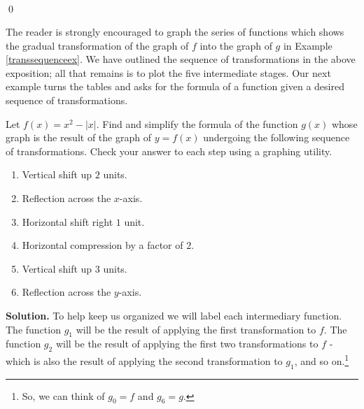 \begin{ex}
\[\begin{array}{cc}
\end{array}\]

\qed

\end{ex}


The reader is strongly encouraged to graph the series of functions which shows the gradual transformation of the graph of $f$ into the graph of $g$ in Example \ref{transsequenceex}.  We have outlined the sequence of transformations in the above exposition; all that remains is to plot the five intermediate stages.
Our next example turns the tables and asks for the formula of a function given a desired sequence of transformations.  

\begin{ex}  \label{graphingcalctrans} Let $f(x) = x^2 - |x|$.  Find and simplify the formula of the function $g(x)$ whose graph is the result of the graph of $y=f(x)$ undergoing the following sequence of transformations. Check your answer to each step using a graphing utility.
\begin{multicols}{2}
\begin{enumerate}

\item  Vertical shift up $2$ units.

\item  Reflection across the $x$-axis.

\item  Horizontal shift right $1$ unit.

\item  Horizontal compression by a factor of $2$.

\item  Vertical shift up $3$ units.

\item  Reflection across the $y$-axis.

\end{enumerate}
\end{multicols}

{\bf Solution.}  To help keep us organized we will label each intermediary function.  The function $g_{1}$ will be the result of applying the first transformation to $f$.  The function $g_{2}$ will be the result of applying the first two transformations to $f$ - which is also the result of applying the second transformation to $g_{1}$, and so on.\footnote{So, we can think of $g_{0} = f$ and $g_{6} = g$.}

\begin{enumerate}


\end{enumerate}
\end{ex}
